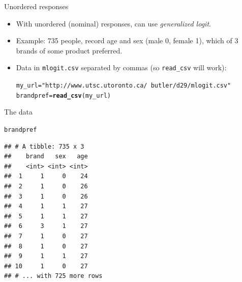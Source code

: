 \documentclass[unknownkeysallowed]{beamer}\usepackage[]{graphicx}\usepackage[]{color}
\makeatletter
\newcommand{\hlstr}[1]{\textcolor[rgb]{0.192,0.494,0.8}{#1}}%
\newcommand{\hlstd}[1]{\textcolor[rgb]{0.345,0.345,0.345}{#1}}%
\newcommand{\hlkwb}[1]{\textcolor[rgb]{0.69,0.353,0.396}{#1}}%
\newcommand{\hlkwd}[1]{\textcolor[rgb]{0.737,0.353,0.396}{\textbf{#1}}}%
\newenvironment{kframe}{%
 \def\at@end@of@kframe{}%
 \ifinner\ifhmode%
  \def\at@end@of@kframe{\end{minipage}}%
  \begin{minipage}{\columnwidth}%
 \fi\fi%
 \def\FrameCommand##1{\hskip\@totalleftmargin \hskip-\fboxsep
 \colorbox{shadecolor}{##1}\hskip-\fboxsep
     \hskip-\linewidth \hskip-\@totalleftmargin \hskip\columnwidth}%
 \MakeFramed {\advance\hsize-\width
   \@totalleftmargin\z@ \linewidth\hsize
   \@setminipage}}%
 {\par\unskip\endMakeFramed%
 \at@end@of@kframe}
\newenvironment{knitrout}{}{} %
\makeatother
\begin{document}
\begin{frame}[fragile]{Unordered responses}

  \begin{itemize}
  \item With unordered (nominal) responses, can use {\em generalized logit}.
  \item Example: 735 people, record age and sex (male 0, female 1), which of 3 brands of some product preferred.
  \item Data in \verb-mlogit.csv- separated by commas (so
    \texttt{read\_csv} will work):

 
\begin{knitrout}
\color{fgcolor}\begin{kframe}
\begin{alltt}
\hlstd{my_url}\hlkwb{=}\hlstr{"http://www.utsc.utoronto.ca/~butler/d29/mlogit.csv"}
\hlstd{brandpref}\hlkwb{=}\hlkwd{read_csv}\hlstd{(my_url)}
\end{alltt}


{\ttfamily\noindent\itshape\color{messagecolor}{\#\# Parsed with column specification:\\\#\# cols(\\\#\#\ \  brand = col\_integer(),\\\#\#\ \  sex = col\_integer(),\\\#\#\ \  age = col\_integer()\\\#\# )}}\end{kframe}
\end{knitrout}
    

  \end{itemize}

\end{frame}

\begin{frame}[fragile]{The data}
  
\begin{knitrout}
\color{fgcolor}\begin{kframe}
\begin{alltt}
\hlstd{brandpref}
\end{alltt}
\begin{verbatim}
## # A tibble: 735 x 3
##    brand   sex   age
##    <int> <int> <int>
##  1     1     0    24
##  2     1     0    26
##  3     1     0    26
##  4     1     1    27
##  5     1     1    27
##  6     3     1    27
##  7     1     0    27
##  8     1     0    27
##  9     1     1    27
## 10     1     0    27
## # ... with 725 more rows
\end{verbatim}
\end{kframe}
\end{knitrout}
  
\end{frame}
\end{document}
